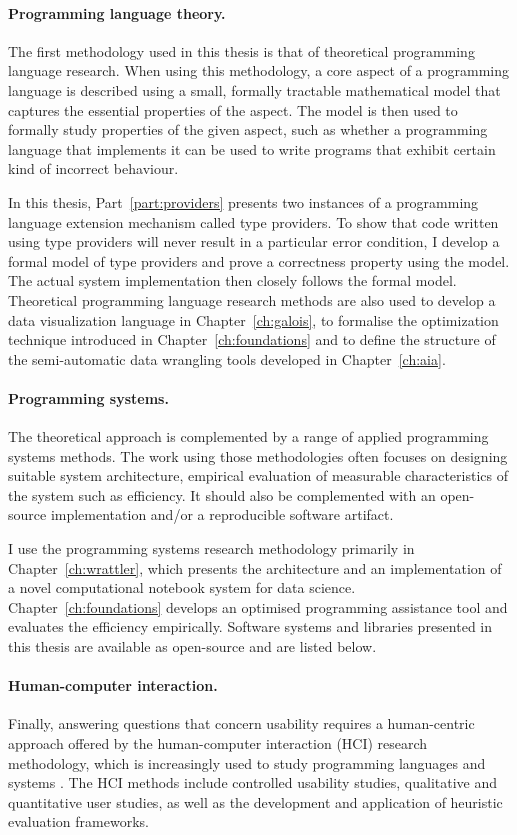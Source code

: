 \documentclass[fleqn,11pt]{report}
\theoremstyle{definition}
\begin{document}
\paragraph{Programming language theory.}
The first methodology used in this thesis is that of theoretical programming language research.
When using this methodology, a core aspect of a programming language is described using a small,
formally tractable mathematical model that captures the essential properties of the aspect.
The model is then used to formally study properties of the given aspect, such as whether a
programming language that implements it can be used to write programs that exhibit certain kind
of incorrect behaviour.

In this thesis, Part~\ref{part:providers} presents two instances of a programming language
extension mechanism called type providers. To show that code written using type providers will
never result in a particular error condition, I develop a formal model of type providers and prove
a correctness property using the model. The actual system implementation then closely follows the
formal model. Theoretical programming language research methods are also used to develop a data
visualization language in Chapter~\ref{ch:galois}, to formalise the optimization technique introduced
in Chapter~\ref{ch:foundations} and to define the structure of the semi-automatic data wrangling
tools developed in Chapter~\ref{ch:aia}.

\paragraph{Programming systems.}
The theoretical approach is complemented by a range of applied programming systems methods.
The work using those methodologies often focuses on designing suitable system architecture,
empirical evaluation of measurable characteristics of the system such as efficiency. It should
also be complemented with an open-source implementation and/or a reproducible software artifact.

I use the programming systems research methodology primarily in Chapter~\ref{ch:wrattler}, which
presents the architecture and an implementation of a novel computational notebook system for data
science. Chapter~\ref{ch:foundations} develops an optimised programming assistance tool and
evaluates the efficiency empirically. Software systems and libraries presented in this thesis
are available as open-source and are listed below.

\paragraph{Human-computer interaction.}
Finally, answering questions that concern usability requires a human-centric approach offered by
the human-computer interaction (HCI) research methodology, which is increasingly used to study
programming languages and systems \citep{chasins-2021-plhci}. The HCI methods include controlled
usability studies, qualitative and quantitative user studies, as well as the development and
application of heuristic evaluation frameworks.
\end{document}
